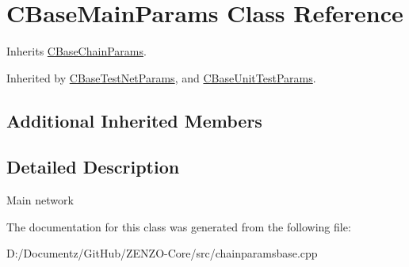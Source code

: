 \hypertarget{class_c_base_main_params}{}\section{C\+Base\+Main\+Params Class Reference}
\label{class_c_base_main_params}


Inherits \mbox{\hyperlink{class_c_base_chain_params}{C\+Base\+Chain\+Params}}.



Inherited by \mbox{\hyperlink{class_c_base_test_net_params}{C\+Base\+Test\+Net\+Params}}, and \mbox{\hyperlink{class_c_base_unit_test_params}{C\+Base\+Unit\+Test\+Params}}.

\subsection*{Additional Inherited Members}


\subsection{Detailed Description}
Main network 

The documentation for this class was generated from the following file\+:\begin{DoxyCompactItemize}
\item 
D\+:/\+Documentz/\+Git\+Hub/\+Z\+E\+N\+Z\+O-\/\+Core/src/chainparamsbase.\+cpp\end{DoxyCompactItemize}
